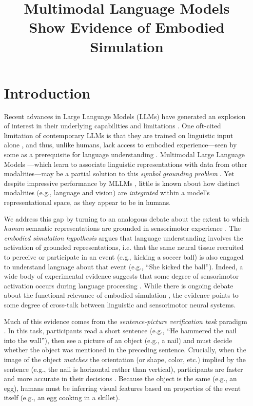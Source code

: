 \documentclass[10pt, a4paper]{article}
\title{Multimodal Language Models Show Evidence of Embodied Simulation}
\begin{document}
\maketitleabstract

\section{Introduction}

Recent advances in Large Language Models (LLMs) have generated an explosion of interest in their underlying capabilities and limitations \cite{thirunavukarasu2023large}. One oft-cited limitation of contemporary LLMs is that they are trained on linguistic input alone \cite{bender2020climbing}, and thus, unlike humans, lack access to embodied experience---seen by some as a prerequisite for language understanding \cite{bisk2020experience, harnad1990symbol, mollo2023vector}.
Multimodal Large Language Models \cite[MLLMs][]{driess2023palm, girdhar2023imagebind, huang2023language}---which learn to associate linguistic representations with data from other modalities---may be a partial solution to this \textit{symbol grounding problem} \cite{harnad1990symbol}.
Yet despite impressive performance by MLLMs \cite{dosovitskiyImageWorth16x162021}, little is known about how distinct modalities (e.g., language and vision) are \textit{integrated} within a model's representational space, as they appear to be in humans.

We address this gap by turning to an analogous debate about the extent to which \textit{human} semantic representations are grounded in sensorimotor experience \cite{barsalou1999perceptual}. The \textit{embodied simulation hypothesis} \cite{bergen2015embodiment, glenberg2010embodiment} argues that language understanding involves the activation of grounded representations, i.e. that the same neural tissue recruited to perceive or participate in an event (e.g., kicking a soccer ball) is also engaged to understand language about that event (e.g., ``She kicked the ball''). Indeed, a wide body of experimental evidence suggests that some degree of sensorimotor activation occurs during language processing \cite{zwaanRevisitingMentalSimulation2012, winter2012language}. While there is ongoing debate about the functional relevance of embodied simulation \cite{glenberg2008use, mahon2008critical, montero2022no, ostarek2021towards}, the evidence points to some degree of cross-talk between linguistic and sensorimotor neural systems. 

Much of this evidence comes from the \textit{sentence-picture verification task} paradigm \cite{stanfield2001effect}. In this task, participants read a short sentence (e.g., ``He hammered the nail into the wall''), then see a picture of an object (e.g., a nail) and must decide whether the object was mentioned in the preceding sentence. Crucially, when the image of the object \textit{matches} the orientation (or shape, color, etc.) implied by the sentence (e.g., the nail is horizontal rather than vertical), participants are faster and more accurate in their decisions \cite{stanfield2001effect, pecher2009short, connell2007representing}. Because the object is the same (e.g., an egg), humans must be inferring visual features based on properties of the event itself (e.g., an egg cooking in a skillet).
\end{document}
